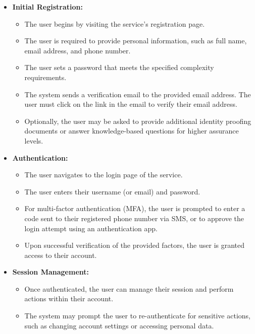 \documentclass{article}
\begin{document}
                    \begin{itemize}
                        \item \textbf{Initial Registration:}
                        \begin{itemize}
                            \item The user begins by visiting the service's registration page.
                            \item The user is required to provide personal information, such as full name, email address, and phone number.
                            \item The user sets a password that meets the specified complexity requirements.
                            \item The system sends a verification email to the provided email address. The user must click on the link in the email to verify their email address.
                            \item Optionally, the user may be asked to provide additional identity proofing documents or answer knowledge-based questions for higher assurance levels.
                        \end{itemize}
                        
                        \item \textbf{Authentication:}
                        \begin{itemize}
                            \item The user navigates to the login page of the service.
                            \item The user enters their username (or email) and password.
                            \item For multi-factor authentication (MFA), the user is prompted to enter a code sent to their registered phone number via SMS, or to approve the login attempt using an authentication app.
                            \item Upon successful verification of the provided factors, the user is granted access to their account.
                        \end{itemize}
                        
                        \item \textbf{Session Management:}
                        \begin{itemize}
                            \item Once authenticated, the user can manage their session and perform actions within their account.
                            \item The system may prompt the user to re-authenticate for sensitive actions, such as changing account settings or accessing personal data.
                        \end{itemize}
                        

\end{itemize}
\end{document}
